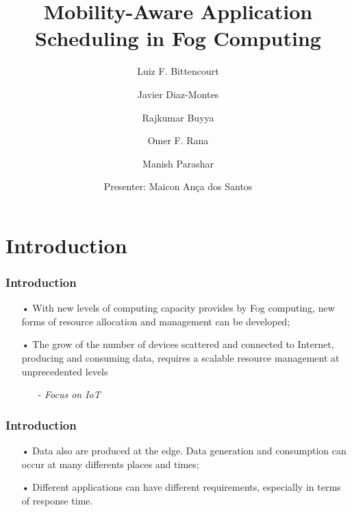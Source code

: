 \documentclass[10pt, pdf, xcolor=pdftex, dvipsnames, table]{beamer}
\title{Mobility-Aware Application Scheduling in Fog Computing}
\author{Luiz F. Bittencourt %
\and Javier Diaz-Montes %
\and Rajkumar Buyya %
\and Omer F. Rana
\and Manish Parashar
\newline
\newline
\and Presenter: Maicon Ança dos Santos
}
\begin{document}
\frame{\titlepage}



\section[Introduction]{Introduction}


\begin{frame}
	\frametitle{Introduction}
 	\begin{block}{}
 		\begin{itemize}
 			\item[•] With new levels of computing capacity provides by Fog computing, new forms of resource allocation and management can be developed;
 			\newline
 		    \item[•] The grow of the number of devices scattered and connected to Internet, producing and consuming data, requires a scalable resource management at unprecedented levels
 		    \begin{itemize}
 		    	\item[-] \footnotesize\textit{Focus on IoT}
			\end{itemize}
 		\end{itemize}
 	\end{block}
\end{frame}

\begin{frame}
	\frametitle{Introduction}
 	\begin{block}{}
 		\begin{itemize}
 			\item[•] Data also are produced at the edge. Data generation and consumption can occur at many differents places and times;
 			\newline
 		    \item[•] Different applications can have different requirements, especially in terms of response time.
 		\end{itemize}
 	\end{block}
\end{frame}
\end{document}
